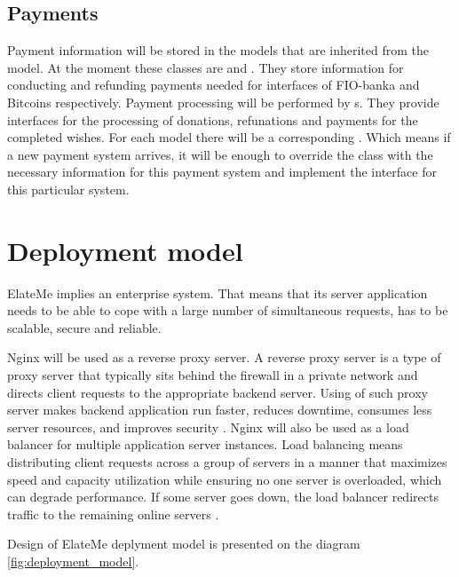 \subsection{Payments}
Payment information will be stored in the models that are inherited from the  model. At the moment these
classes are  and . They store information for conducting and refunding
payments needed for interfaces of FIO-banka and Bitcoins respectively. Payment processing will be performed by
s. They provide interfaces for the processing of donations, refunations and payments for the
completed wishes. For each  model there will be a corresponding . Which means if
a new payment system arrives, it will be enough to override the  class with the necessary information
for this payment system and implement the  interface for this particular system.




\section{Deployment model}
ElateMe implies an enterprise system. That means that its server application needs to be able to cope with a large
number of simultaneous requests, has to be scalable, secure and reliable.

Nginx will be used as a reverse proxy server. A reverse proxy server is a type of proxy server that typically sits
behind the firewall in a private network and directs client requests to the appropriate backend server. Using of such
proxy server makes backend application run faster, reduces downtime, consumes less server resources, and improves
security \cite{nginxdeploy}. Nginx will also be used as a load balancer for multiple application server instances. Load
balancing means distributing client requests across a group of servers in a manner that maximizes speed and capacity
utilization while ensuring no one server is overloaded, which can degrade performance. If some server goes down, the
load balancer redirects traffic to the remaining online servers \cite{reverseproxy}.

Design of ElateMe deplyment model is presented on the diagram \ref{fig:deployment_model}.

